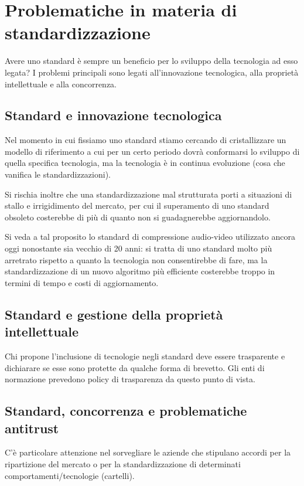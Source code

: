 \section{Problematiche in materia di standardizzazione}

Avere uno standard è sempre un beneficio per lo sviluppo della tecnologia ad esso legata? I problemi principali sono legati all'innovazione tecnologica, alla proprietà intellettuale e alla concorrenza. 

\subsection{Standard e innovazione tecnologica}
Nel momento in cui fissiamo uno standard stiamo cercando di cristallizzare un modello di riferimento a cui per un certo
periodo dovrà conformarsi lo sviluppo di quella specifica tecnologia, ma la tecnologia è in continua evoluzione (cosa che vanifica le standardizzazioni).

Si rischia inoltre che una standardizzazione mal strutturata porti a situazioni di stallo e irrigidimento del mercato, per cui il superamento di uno standard obsoleto costerebbe di più di quanto non si guadagnerebbe aggiornandolo. 

Si veda a tal proposito lo standard di compressione audio-video utilizzato ancora oggi nonostante sia vecchio di 20 anni: si tratta di uno standard molto più arretrato rispetto a quanto la tecnologia non consentirebbe di fare, ma la standardizzazione di un nuovo algoritmo più efficiente costerebbe troppo in termini di tempo e costi di aggiornamento. 

\subsection{Standard e gestione della proprietà intellettuale}
Chi propone l'inclusione di tecnologie negli standard deve essere trasparente e dichiarare se esse sono protette da qualche forma di brevetto. 
Gli enti di normazione prevedono policy di trasparenza da questo punto di vista.

\subsection{Standard, concorrenza e problematiche antitrust}
C'è particolare attenzione nel sorvegliare le aziende che stipulano accordi per la ripartizione del mercato o per la standardizzazione di determinati comportamenti/tecnologie (cartelli). 

